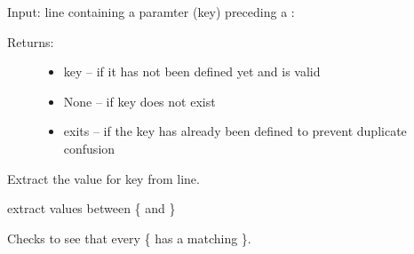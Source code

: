 \documentclass[letterpaper,10pt,english]{sphinxmanual}
\begin{document}
\begin{fulllineitems}
\begin{fulllineitems}
\label{\detokenize{pydfnworks:pydfnworks.helper.input_helper.find_key}}
Input: line containing a paramter (key) preceding a \sphinxquotedblright{}:\sphinxquotedblright{}
\begin{description}
\item[{Returns: }] \leavevmode\begin{itemize}
\item {} 
key -- if it has not been defined yet and is valid

\item {} 
None -- if key does not exist

\item {} 
exits -- if the key has already been defined to prevent duplicate confusion

\end{itemize}

\end{description}

\end{fulllineitems}


\begin{fulllineitems}
\label{\detokenize{pydfnworks:pydfnworks.helper.input_helper.find_val}}
Extract the value for key from line.

\end{fulllineitems}


\begin{fulllineitems}
\label{\detokenize{pydfnworks:pydfnworks.helper.input_helper.get_groups}}
extract values between \{ and \}

\end{fulllineitems}


\begin{fulllineitems}
\label{\detokenize{pydfnworks:pydfnworks.helper.input_helper.has_curlys}}
Checks to see that every \{ has a matching \}.


\end{fulllineitems}
\end{fulllineitems}
\end{document}
